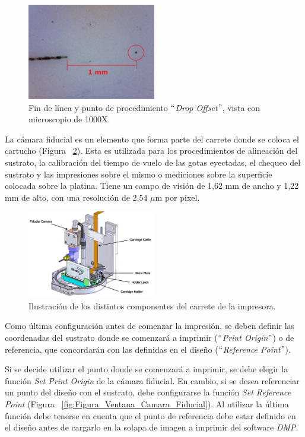 \begin{figure}[H]
  \centering
    \includegraphics[width=0.5\textwidth]{Figuras/Figura_prueba_Drop_Spacing}
  \caption{Fin de línea y punto de procedimiento $``$\textit{Drop Offset}$"$, vista con microscopio de 1000X.}
  \label{fig:Figura_prueba_Drop_Spacing}
\end{figure}

La cámara fiducial es un elemento que forma parte del carrete donde se coloca el cartucho (Figura ~\ref{fig:Figura_Camara_Fiducial}). Esta es utilizada para los procedimientos de alineación del sustrato,  la calibración del tiempo de vuelo de las gotas eyectadas, el chequeo del sustrato y las impresiones sobre el mismo o mediciones sobre la superficie colocada sobre la platina. Tiene un campo de visión de 1,62 mm de ancho y 1,22 mm de alto, con una resolución de 2,54 $\mu$m por pixel.

\begin{figure}[H]
  \centering
    \includegraphics[width=0.5\textwidth]{Figuras/Figura_Camara_Fiducial}
  \caption{Ilustración de los distintos componentes del carrete de la impresora.}
  \label{fig:Figura_Camara_Fiducial}
\end{figure}

Como última configuración antes de comenzar la impresión, se deben definir las coordenadas del sustrato donde se comenzará a imprimir ($``$\textit{Print Origin}$"$) o de referencia, que concordarán con las definidas en el diseño ($``$\textit{Reference Point}$"$).

Si se decide utilizar el punto donde se comenzará a imprimir, se debe elegir la función \textit{Set Print Origin} de la cámara fiducial. En cambio, si se desea referenciar un punto del diseño con el sustrato, debe configurarse la función \textit{Set Reference Point} (Figura ~\ref{fig:Figura_Ventana_Camara_Fiducial}). Al utilizar la última función debe tenerse en cuenta que el punto de referencia debe estar definido en el diseño antes de cargarlo en la solapa de imagen a imprimir del software \textit{DMP}.

